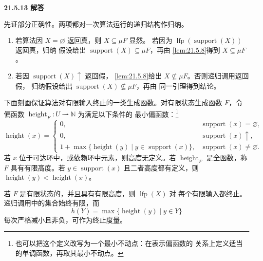 \begin{taplauthorsolutionentrybox}
\label{sol:author:21.5.13}
\textbf{21.5.13 解答}

先证部分正确性。两项都对一次算法运行的递归结构作归纳。
\begin{enumerate}
  \item 若算法因 \(X=\varnothing\) 返回真，则 \(X\subseteq\mu F\) 显然。
        若因为 \(\operatorname{lfp}(\operatorname{support}(X))\) 返回真，归纳
        假设给出 \(\operatorname{support}(X)\subseteq\mu F\)，再由
        \cref{lem:21.5.8}得到 \(X\subseteq\mu F\)。
  \item 若因 \(\operatorname{support}(X)\uparrow\) 返回假，
        \cref{lem:21.5.8}给出 \(X\not\subseteq\mu F\)。否则递归调用返回假，
        归纳假设给出 \(\operatorname{support}(X)\not\subseteq\mu F\)，再由
        同一引理得到结论。
\end{enumerate}

下面刻画保证算法对有限输入终止的一类生成函数。对有限状态生成函数 \(F\)，令
偏函数 \(\operatorname{height}_F:U\rightharpoonup\mathbb N\) 为满足以下条件的
最小偏函数：\footnote{也可以把这个定义改写为一个最小不动点：在表示偏函数的
关系上定义适当的单调函数，再取其最小不动点。}
\[
\operatorname{height}(x)=
\begin{cases}
0,&\operatorname{support}(x)=\varnothing,\\
0,&\operatorname{support}(x)\uparrow,\\
1+\max\{\operatorname{height}(y)\mid y\in\operatorname{support}(x)\},
  &\operatorname{support}(x)\ne\varnothing.
\end{cases}
\]
若 \(x\) 位于可达环中，或依赖环中元素，则高度无定义。若
\(\operatorname{height}_F\) 是全函数，称 \(F\) 具有有限高度。若
\(y\in\operatorname{support}(x)\) 且二者高度都有定义，则
\(\operatorname{height}(y)<\operatorname{height}(x)\)。

若 \(F\) 是有限状态的，并且具有有限高度，则 \(\operatorname{lfp}(X)\) 对
每个有限输入都终止。递归调用中的集合始终有限，而
\[
h(Y)=\max\{\operatorname{height}(y)\mid y\in Y\}
\]
每次严格减小且非负，可作为终止度量。

\end{taplauthorsolutionentrybox}

